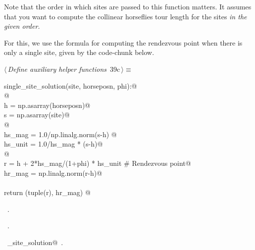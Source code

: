 \documentclass[11.5pt]{report}
\begin{document}
Note that the order in which sites are passed to this function matters. It 
assumes that you want to compute the collinear horseflies tour length for the 
sites \textit{in the given order.} 

For this, we use the formula for computing the rendezvous point when there is 
only a single site, given by the code-chunk below. 


\begin{flushleft} \small\label{scrap43}\raggedright\small
{} $\langle\,${\itshape Define auxiliary helper functions}\nobreak\ {\footnotesize {39c}}$\,\rangle\equiv$
\vspace{-1ex}
\begin{list}{}{} \item
\mbox{}\verb@def single_site_solution(site, horseposn, phi):@\\
\mbox{}\verb@     @\\
\mbox{}\verb@     h = np.asarray(horseposn)@\\
\mbox{}\verb@     s = np.asarray(site)@\\
\mbox{}\verb@     @\\
\mbox{}\verb@     hs_mag  = 1.0/np.linalg.norm(s-h) @\\
\mbox{}\verb@     hs_unit = 1.0/hs_mag * (s-h)@\\
\mbox{}\verb@     @\\
\mbox{}\verb@     r      = h +  2*hs_mag/(1+phi) * hs_unit # Rendezvous point@\\
\mbox{}\verb@     hr_mag = np.linalg.norm(r-h)@\\
\mbox{}\verb@@\\
\mbox{}\verb@     return (tuple(r), hr_mag) @\\
\mbox{}\verb@@{\NWsep}
\end{list}
\vspace{-1.5ex}
\footnotesize
\begin{list}{}{\setlength{\itemsep}{-\parsep}\setlength{\itemindent}{-\leftmargin}}
\item \NWtxtMacroDefBy\ .
\item \NWtxtMacroRefIn\ .
\item \NWtxtIdentsDefed\nobreak\  \verb@single_site_solution@\nobreak\ .
\item{}
\end{list}
\vspace{4ex}
\end{flushleft}
\end{document}
